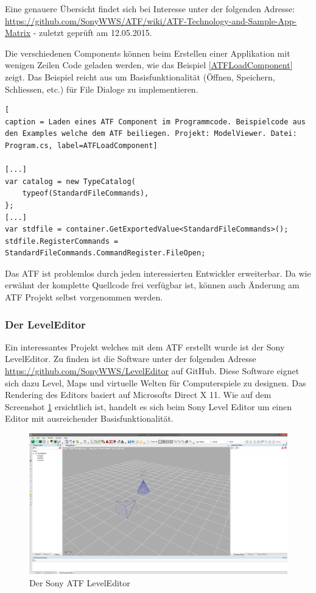 \documentclass[pagesize, paper=a4, fontsize=12pt, titlepage=true, headings=small, headnosepline, abstractoff, liststotoc, nochapterprefix, plainheadsepline, twoside]{scrreprt}
\begin{document}
Eine genauere Übersicht findet sich bei Interesse unter der folgenden Adresse: \url{https://github.com/SonyWWS/ATF/wiki/ATF-Technology-and-Sample-App-Matrix} - zuletzt geprüft am 12.05.2015.

Die verschiedenen Components können beim Erstellen einer Applikation mit wenigen Zeilen Code geladen werden, wie das Beispiel \ref{ATFLoadComponent} zeigt. Das Beispiel reicht aus um Basisfunktionalität (Öffnen, Speichern, Schliessen, etc.) für File Dialoge zu implementieren.

\begin{lstlisting}[
caption = Laden eines ATF Component im Programmcode. Beispielcode aus den Examples welche dem ATF beiliegen. Projekt: ModelViewer. Datei: Program.cs, label=ATFLoadComponent]

[...]
var catalog = new TypeCatalog(
	typeof(StandardFileCommands),
};
[...]
var stdfile = container.GetExportedValue<StandardFileCommands>();
stdfile.RegisterCommands = StandardFileCommands.CommandRegister.FileOpen;

\end{lstlisting}

Das ATF ist problemlos durch jeden interessierten Entwickler erweiterbar. Da wie erwähnt der komplette Quellcode frei verfügbar ist, können auch Änderung am ATF Projekt selbst vorgenommen werden.

\subsubsection{Der LevelEditor}
Ein interessantes Projekt welches mit dem ATF erstellt wurde ist der Sony LevelEditor. Zu finden ist die Software unter der folgenden Adresse \url{https://github.com/SonyWWS/LevelEditor} auf GitHub. Diese Software eignet sich dazu Level, Maps und virtuelle Welten für Computerspiele zu designen. Das Rendering des Editors basiert auf Microsofts Direct X 11. Wie auf dem Screenshot \ref{SonyATFLevelEditor} ersichtlich ist, handelt es sich beim Sony Level Editor um einen Editor mit ausreichender Basisfunktionalität.

\begin{figure}[ht]
	\centering
	\includegraphics[width=\linewidth]{Bilder/ATFLevelEditor.jpg}
	\caption{Der Sony ATF LevelEditor}
	\label{SonyATFLevelEditor}
\end{figure}
\end{document}
